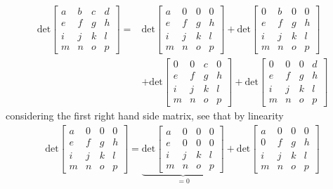 \documentclass{report}
\begin{document}
\begin{align*}
\text{det}\left[\begin{array}{cccc}
a&b&c&d\\
e&f&g&h\\
i&j&k&l\\
m&n&o&p
\end{array}\right]=&
\text{det}\left[\begin{array}{cccc}
a&0&0&0\\
e&f&g&h\\
i&j&k&l\\
m&n&o&p
\end{array}\right]+
\text{det}\left[\begin{array}{cccc}
0&b&0&0\\
e&f&g&h\\
i&j&k&l\\
m&n&o&p
\end{array}\right]\\
&+\text{det}\left[\begin{array}{cccc}
0&0&c&0\\
e&f&g&h\\
i&j&k&l\\
m&n&o&p
\end{array}\right]+
\text{det}\left[\begin{array}{cccc}
0&0&0&d\\
e&f&g&h\\
i&j&k&l\\
m&n&o&p
\end{array}\right]
\end{align*}
considering the first right hand side matrix, see that by linearity
\begin{align*}
\text{det}\left[\begin{array}{cccc}
a&0&0&0\\
e&f&g&h\\
i&j&k&l\\
m&n&o&p
\end{array}\right]=\underbrace{\text{det}\left[\begin{array}{cccc}
a&0&0&0\\
e&0&0&0\\
i&j&k&l\\
m&n&o&p
\end{array}\right]}_{=0}+\text{det}\left[\begin{array}{cccc}
a&0&0&0\\
0&f&g&h\\
i&j&k&l\\
m&n&o&p
\end{array}\right]
\end{align*}
\end{document}
